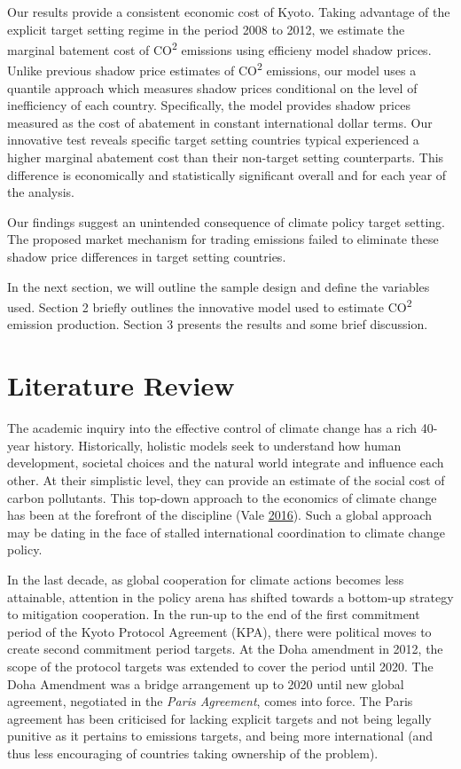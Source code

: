 \documentclass[12pt,]{article}
\begin{document}
Our results provide a consistent economic cost of Kyoto. Taking advantage of the explicit target setting regime in the period 2008 to 2012, we estimate the marginal batement cost of CO\textsuperscript{2} emissions using efficieny model shadow prices. Unlike previous shadow price estimates of CO\textsuperscript{2} emissions, our model uses a quantile approach which measures shadow prices conditional on the level of inefficiency of each country. Specifically, the model provides shadow prices measured as the cost of abatement in constant international dollar terms. Our innovative test reveals specific target setting countries typical experienced a higher marginal abatement cost than their non-target setting counterparts. This difference is economically and statistically significant overall and for each year of the analysis.

Our findings suggest an unintended consequence of climate policy target setting. The proposed market mechanism for trading emissions failed to eliminate these shadow price differences in target setting countries.

In the next section, we will outline the sample design and define the variables used. Section 2 briefly outlines the innovative model used to estimate CO\textsuperscript{2} emission production. Section 3 presents the results and some brief discussion.

\hypertarget{literature-review}{%
\section{Literature Review}\label{literature-review}}

The academic inquiry into the effective control of climate change has a rich 40-year history. Historically, holistic models seek to understand how human development, societal choices and the natural world integrate and influence each other. At their simplistic level, they can provide an estimate of the social cost of carbon pollutants. This top-down approach to the economics of climate change has been at the forefront of the discipline (Vale \protect\hyperlink{ref-Vale2016}{2016}). Such a global approach may be dating in the face of stalled international coordination to climate change policy.

In the last decade, as global cooperation for climate actions becomes less attainable, attention in the policy arena has shifted towards a bottom-up strategy to mitigation cooperation. In the run-up to the end of the first commitment period of the Kyoto Protocol Agreement (KPA), there were political moves to create second commitment period targets. At the Doha amendment in 2012, the scope of the protocol targets was extended to cover the period until 2020. The Doha Amendment was a bridge arrangement up to 2020 until new global agreement, negotiated in the \emph{Paris Agreement}, comes into force. The Paris agreement has been criticised for lacking explicit targets and not being legally punitive as it pertains to emissions targets, and being more international (and thus less encouraging of countries taking ownership of the problem).
\end{document}
